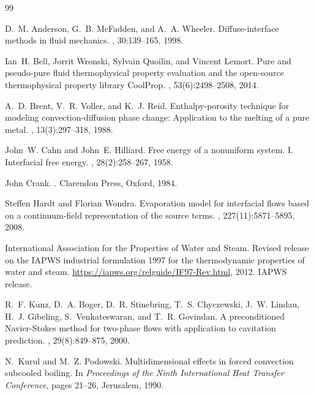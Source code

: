 \documentclass[UTF8,fontset=none]{ctexart}
\begin{document}
\begin{thebibliography}{99}

D.~M. Anderson, G.~B. McFadden, and A.~A. Wheeler.
\newblock Diffuse-interface methods in fluid mechanics.
, 30:139--165, 1998.

Ian~H. Bell, Jorrit Wronski, Sylvain Quoilin, and Vincent Lemort.
\newblock Pure and pseudo-pure fluid thermophysical property evaluation and the
  open-source thermophysical property library {CoolProp}.
, 53(6):2498--2508,
  2014.

A.~D. Brent, V.~R. Voller, and K.~J. Reid.
\newblock Enthalpy-porosity technique for modeling convection-diffusion phase
  change: Application to the melting of a pure metal.
, 13(3):297--318, 1988.

John~W. Cahn and John~E. Hilliard.
\newblock Free energy of a nonuniform system. I. Interfacial free energy.
, 28(2):258--267, 1958.

John Crank.
.
\newblock Clarendon Press, Oxford, 1984.

Steffen Hardt and Florian Wondra.
\newblock Evaporation model for interfacial flows based on a continuum-field
  representation of the source terms.
, 227(11):5871--5895, 2008.

{International Association for the Properties of Water and Steam}.
\newblock Revised release on the {IAPWS} industrial formulation 1997 for the
  thermodynamic properties of water and steam.
\newblock \url{https://iapws.org/relguide/IF97-Rev.html}, 2012.
\newblock IAPWS release.

R.~F. Kunz, D.~A. Boger, D.~R. Stinebring, T.~S. Chyczewski, J.~W. Lindau,
  H.~J. Gibeling, S.~Venkateswaran, and T.~R. Govindan.
\newblock A preconditioned Navier-Stokes method for two-phase flows with
  application to cavitation prediction.
, 29(8):849--875, 2000.

N.~Kurul and M.~Z. Podowski.
\newblock Multidimensional effects in forced convection subcooled boiling.
\newblock In {\em Proceedings of the Ninth International Heat Transfer
  Conference}, pages 21--26, Jerusalem, 1990.


\end{thebibliography}
\end{document}
